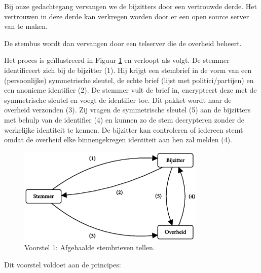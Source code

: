 \documentclass[a4paper,12pt]{article}
\begin{document}
Bij onze gedachtegang vervangen we de bijzitters door een vertrouwde derde. Het
vertrouwen in deze derde kan verkregen worden door er een open source server van
te maken.

De stembus wordt dan vervangen door een telserver die de overheid beheert.

Het proces is ge\"illustreerd in Figuur \ref{fig:voorstel1} en verloopt als
volgt. De stemmer identificeert zich bij de bijzitter (1). Hij krijgt een
stembrief in de vorm van een (persoonlijke) symmetrische sleutel, de echte brief
(lijst met politici/partijen) en een anonieme identifier (2). De stemmer vult de
brief in, encrypteert deze met de symmetrische sleutel en voegt de identifier
toe. Dit pakket wordt naar de overheid verzonden (3). Zij vragen de symmetrische
sleutel (5) aan de bijzitters met behulp van de identifier (4) en kunnen zo de
stem decrypteren zonder de werkelijke identiteit te kennen. De bijzitter kan
controleren of iedereen stemt omdat de overheid elke binnengekregen identiteit
aan hen zal melden (4).

\begin{figure}
  \centering
  \includegraphics[width=0.8\textwidth]{includes/img/schema_voorstel1.eps}
  \caption{Voorstel 1: Afgehaalde stembrieven tellen.}
  \label{fig:voorstel1}
\end{figure}

Dit voorstel voldoet aan de principes:
\end{document}

